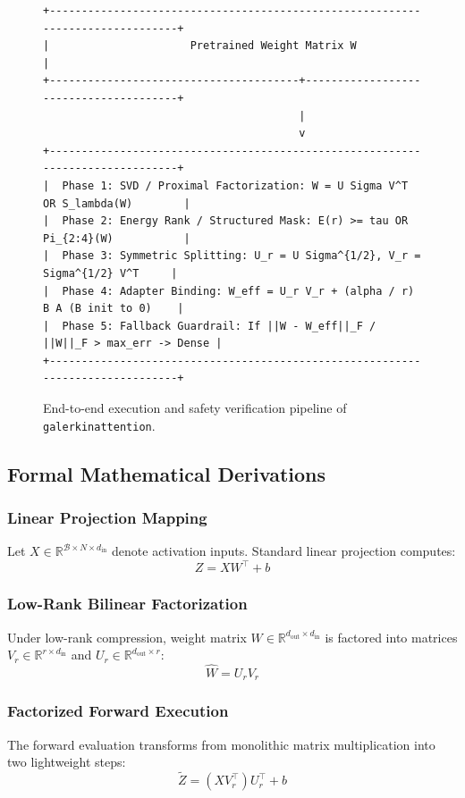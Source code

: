 \begin{figure}[t]
\centering
\begin{verbatim}
+-------------------------------------------------------------------------------+
|                      Pretrained Weight Matrix W                               |
+---------------------------------------+---------------------------------------+
                                        |
                                        v
+-------------------------------------------------------------------------------+
|  Phase 1: SVD / Proximal Factorization: W = U Sigma V^T OR S_lambda(W)        |
|  Phase 2: Energy Rank / Structured Mask: E(r) >= tau OR Pi_{2:4}(W)           |
|  Phase 3: Symmetric Splitting: U_r = U Sigma^{1/2}, V_r = Sigma^{1/2} V^T     |
|  Phase 4: Adapter Binding: W_eff = U_r V_r + (alpha / r) B A (B init to 0)    |
|  Phase 5: Fallback Guardrail: If ||W - W_eff||_F / ||W||_F > max_err -> Dense |
+-------------------------------------------------------------------------------+
\end{verbatim}
\caption{End-to-end execution and safety verification pipeline of \texttt{galerkinattention}.}
\end{figure}

\subsection{Formal Mathematical Derivations}

\subsubsection{Linear Projection Mapping}
Let $X \in \mathbb{R}^{\mathcal{B} \times N \times d_{\text{in}}}$ denote activation inputs. Standard linear projection computes:
\[
Z = X W^\top + b
\]

\subsubsection{Low-Rank Bilinear Factorization}
Under low-rank compression, weight matrix $W \in \mathbb{R}^{d_{\text{out}} \times d_{\text{in}}}$ is factored into matrices $V_r \in \mathbb{R}^{r \times d_{\text{in}}}$ and $U_r \in \mathbb{R}^{d_{\text{out}} \times r}$:
\[
\hat{W} = U_r V_r
\]

\subsubsection{Factorized Forward Execution}
The forward evaluation transforms from monolithic matrix multiplication into two lightweight steps:
\[
\tilde{Z} = (X V_r^\top) U_r^\top + b
\]

